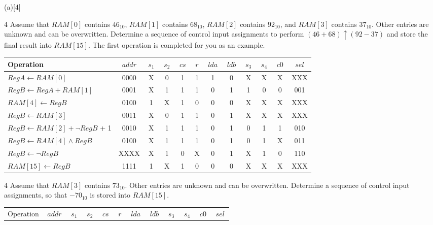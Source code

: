   \begin{question}{(a)}[4]
  \item[4] Assume that $RAM\left[0\right]$ contains $46_{10}$, $RAM\left[1\right]$ contains $68_{10}$, $RAM\left[2\right]$ contains $92_{10}$, and $RAM\left[3\right]$ contains $37_{10}$. Other entries are unknown and can be overwritten. Determine a sequence of control input assignments to perform $(46 + 68) \uparrow (92 - 37)$ and store the final result into $RAM\left[15\right]$. The first operation is completed for you as an example.
  {\color{NavyBlue}
  \begin{Questions}
  \begin{tabular}{p{5cm} | c | c | c | c | c | c | c | c | c | c | c}
  Operation & $\, addr \,$ & $\, s_1 \,$ & $\, s_2 \,$ & $\, cs \,$ & $\, r \,$ & $\, lda \,$ & $\, ldb \,$ & $\, s_3 \,$ & $\, s_4 \,$ & $\, c0 \,$ & $\, sel \,$ \\
  \hline
  $RegA \leftarrow RAM\left[0\right]$ & 0000 & X & 0 & 1 & 1 & 1 & 0 & X & X & X & XXX \\
  $RegB \leftarrow RegA + RAM\left[1\right]$ & 0001 & X & 1 & 1 & 1 & 0 & 1 & 1 & 0 & 0 & 001 \\
  $ RAM\left[4\right] \leftarrow RegB$ & 0100 & 1 & X & 1 & 0 & 0 & 0 & X & X & X & XXX \\
  $RegB \leftarrow RAM\left[3\right]$ & 0011 & X & 0 & 1 & 1 & 0 & 1 & X & X & X & XXX \\
  $RegB \leftarrow RAM\left[2\right] + \lnot RegB$ + 1& 0010 & X & 1 & 1 & 1 & 0 & 1 & 0 & 1 & 1 & 010 \\
  $RegB \leftarrow RAM\left[4\right] \land RegB$ & 0100 & X & 1 & 1 & 1 & 0 & 1 & 0 & 1 & X & 011 \\
  $RegB \leftarrow \lnot RegB$ & XXXX & X & 1 & 0 & X & 0 & 1 & X & 1 & 0 & 110 \\
  $ RAM\left[15\right] \leftarrow RegB$ & 1111 & 1 & X & 1 & 0 & 0 & 0 & X & X & X & XXX \\
  \end{tabular}
  \end{Questions}
  }
  \item[4] Assume that $RAM\left[3\right]$ contains $73_{10}$. Other entries are unknown and can be overwritten. Determine a sequence of control input assignments, so that $-70_{10}$ is stored into $RAM\left[15\right]$.
  {\color{NavyBlue}
 \begin{Questions}
  \begin{tabular}{p{4.3cm} | c | c | c | c | c | c | c | c | c | c | c}
  Operation & $\, addr \,$ & $\, s_1 \,$ & $\, s_2 \,$ & $\, cs \,$ & $\, r \,$ & $\, lda \,$ & $\, ldb \,$ & $\, s_3 \,$ & $\, s_4 \,$ & $\, c0 \,$ & $\, sel \,$ \\

\end{tabular}
\end{Questions}}
\end{question}
